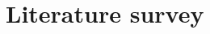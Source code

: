 \documentclass[showkeys,aps,10pt,twocolumn,showpacs,preprintnumbers,amsmath,amssymb,prd,letterpaper,floatfix,nofootinbib,superscriptaddress,]{revtex4-1}
\newcommand\beq{\begin{equation}}
\newcommand\eeq[1]{\label{#1}\end{equation}}
\begin{document}
% 
% 
% 


\section{Literature survey}
\end{document}
